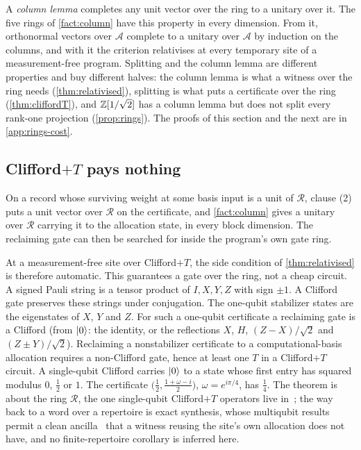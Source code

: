 \documentclass[acmsmall,screen,review,anonymous,nonacm]{acmart}
\begin{document}
A \emph{column lemma} completes any unit vector over the ring
to a unitary over it. The five rings of \cref{fact:column} have this
property in every dimension. From it,
orthonormal vectors over $\mathcal A$ complete to a unitary over
$\mathcal A$ by induction on the columns, and with it the
criterion relativises at every temporary site of a measurement-free program.
Splitting and the column lemma are different properties and buy
different halves: the column lemma is what a witness over the ring needs
(\cref{thm:relativised}), splitting is what puts a certificate over the ring
(\cref{thm:cliffordT}), and $\mathbb{Z}[1/\sqrt2]$ has a column lemma but does not split every
rank-one projection (\cref{prop:rings}).
The proofs
of this section and the next are in \cref{app:rings-cost}.

\stmtRelativisedSite

\subsection{Clifford\texorpdfstring{$+T$}{+T} pays nothing}\label{sec:cliffordT}

\begin{samepage}
\stmtCliffordT
\end{samepage}

On a record whose surviving weight at some basis input is a unit of
$\mathcal R$, clause (2) puts a unit vector over $\mathcal R$ on the
certificate, and \cref{fact:column} gives a unitary over $\mathcal R$ carrying
it to the allocation state, in every block dimension. The reclaiming gate can
then be searched for inside the program's own gate ring.

At a measurement-free site over Clifford$+T$, the side condition of
\cref{thm:relativised} is therefore automatic. This guarantees a gate over the ring, not a cheap circuit. A signed Pauli string is a tensor product of $I,X,Y,Z$
with sign $\pm1$. A Clifford gate preserves these strings under conjugation.
The one-qubit stabilizer states are the eigenstates of $X$, $Y$ and $Z$.
For such a one-qubit certificate a reclaiming gate is a
Clifford (from $\lvert 0 \rangle$: the identity, or the reflections $X$, $H$, $(Z-X)/\sqrt2$ and
$(Z \pm Y)/\sqrt2$). Reclaiming a nonstabilizer certificate to a computational-basis allocation
requires a non-Clifford gate, hence at least
one $T$ in a Clifford$+T$ circuit. A single-qubit Clifford carries $\lvert 0 \rangle$ to a state
whose first entry has squared modulus $0$, $\tfrac12$ or $1$. The
certificate $\bigl(\tfrac12, \tfrac{1+\omega-i}{2}\bigr)$, $\omega =
e^{i\pi/4}$, has $\tfrac14$. The theorem is about
the ring $\mathcal R$, the one single-qubit Clifford$+T$ operators live
in~\cite{Kliuchnikov2013ExactSynthesis}; the way back to a word over a
repertoire is exact synthesis, whose multiqubit results permit a clean
ancilla~\cite{Giles2013ExactSynthesis,Kliuchnikov2013ExactSynthesis,Amy2020Restricted}
that a witness reusing the site's own allocation does not have, and no
finite-repertoire corollary is inferred here.
\end{document}
